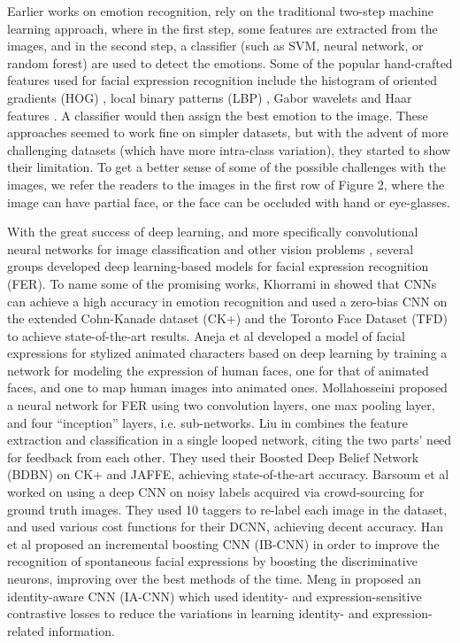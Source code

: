 \documentclass[conference]{IEEEtran}
\begin{document}
Earlier works on emotion recognition, rely on the traditional two-step machine learning approach, where in the first step, some features are extracted from the images, and in the second step, a classifier (such as SVM, neural network, or random forest) are used to detect the emotions.
Some of the popular hand-crafted features used for facial expression recognition include the histogram of oriented gradients (HOG) \cite{mcconnell1986method,chen2014facial}, local binary patterns (LBP) \cite{shan2009facial}, Gabor wavelets \cite{bartlett2005recognizing} and Haar features \cite{whitehill2006haar}. 
A classifier would then assign the best emotion to the image. 
These approaches seemed to work fine on simpler datasets, but with the advent of more challenging datasets (which have more intra-class variation), they started to show their limitation. 
To get a better sense of some of the possible challenges with the images, we refer the readers to the images in the first row of Figure 2, where the image can have partial face, or the face can be occluded with hand or eye-glasses.

With the great success of deep learning, and more specifically convolutional neural networks for image classification and other vision problems \cite{alexnet,resnet,semseg,maskrcnn,iriscnn,adnet,aae,gan}, several groups developed deep learning-based models for facial expression recognition (FER).
To name some of the promising works, Khorrami in \cite{khorrami2015deep} showed that CNNs can achieve a high accuracy in emotion recognition and used a zero-bias CNN on the extended Cohn-Kanade dataset (CK+) and the Toronto Face Dataset (TFD)  to achieve state-of-the-art results.
Aneja et al \cite{aneja2016modeling} developed a model of facial expressions for stylized animated characters based on deep learning by training a network for modeling the expression of human faces, one for that of animated faces, and one to map human images into animated ones.
Mollahosseini \cite{mollahosseini2016going} proposed a neural network for FER using two convolution layers, one max pooling layer, and four ``inception'' layers, i.e. sub-networks.
Liu in \cite{liu2014facial} combines the feature extraction and classification in a single looped network, citing the two parts' need for feedback from each other. They used their Boosted Deep Belief Network (BDBN) on CK+ and JAFFE, achieving state-of-the-art accuracy.
Barsoum et al \cite{barsoum2016training} worked on using a deep CNN on noisy labels acquired via crowd-sourcing for ground truth images. They used 10 taggers to re-label each image in the dataset, and used various cost functions for their DCNN, achieving decent accuracy.
Han et al \cite{IBCNN} proposed an incremental boosting CNN (IB-CNN) in order to improve the recognition of spontaneous facial expressions by boosting the discriminative neurons, improving over the best methods of the time.
Meng in \cite{IACNN} proposed an identity-aware CNN (IA-CNN) which used identity- and expression-sensitive contrastive losses to reduce the variations in learning  identity- and expression-related information.
\end{document}
